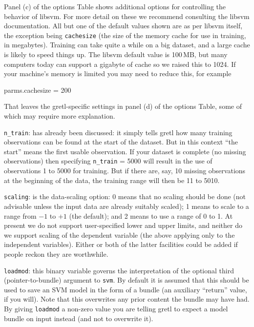 \documentclass{article}
\begin{document}
Panel (c) of the options Table shows additional options for
controlling the behavior of \textsf{libsvm}. For more detail on these
we recommend consulting the \textsf{libsvm} documentation. All but one
of the default values shown are as per \textsf{libsvm} itself, the
exception being \texttt{cachesize} (the size of the memory cache for
use in training, in megabytes). Training can take quite a while on a
big dataset, and a large cache is likely to speed things up. The
\textsf{libsvm} default value is 100\,MB, but many computers today can
support a gigabyte of cache so we raised this to 1024. If your
machine's memory is limited you may need to reduce this, for example
\begin{code}
parms.cachesize = 200
\end{code}

That leaves the gretl-specific settings in panel (d) of the options
Table, some of which may require more explanation.

\texttt{n\_train}: has already been discussed: it simply tells gretl
how many training observations can be found at the start of the
dataset. But in this context ``the start'' means the first usable
observation. If your dataset is complete (no missing observations)
then specifying \texttt{n\_train} = 5000 will result in the use of
observations 1 to 5000 for training. But if there are, say, 10 missing
observations at the beginning of the data, the training range will
then be 11 to 5010.

\texttt{scaling}: is the data-scaling option: 0 means that no scaling
should be done (not advisable unless the input data are already
suitably scaled); 1 means to scale to a range from $-1$ to $+1$ (the
default); and 2 means to use a range of 0 to 1. At present we do not
support user-specified lower and upper limits, and neither do we
support scaling of the dependent variable (the above applying only to
the independent variables). Either or both of the latter facilities
could be added if people reckon they are worthwhile.

\texttt{loadmod}: this binary variable governs the interpretation of
the optional third (pointer-to-bundle) argument to \texttt{svm}. By
default it is assumed that this should be used to save an SVM model in
the form of a bundle (an auxiliary ``return'' value, if you
will). Note that this overwrites any prior content the bundle may have
had. By giving \texttt{loadmod} a non-zero value you are telling gretl
to expect a model bundle on input instead (and not to overwrite it).
\end{document}
